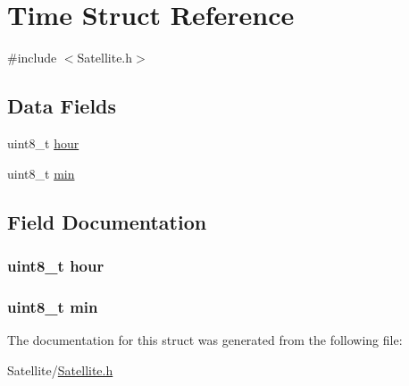 \hypertarget{struct_time}{\section{Time Struct Reference}
\label{struct_time}
}


{\ttfamily \#include $<$Satellite.\-h$>$}

\subsection*{Data Fields}
\begin{DoxyCompactItemize}
\item 
uint8\-\_\-t \hyperlink{struct_time_ae5af4ff48939d13d480f87e56a9385d6}{hour}
\item 
uint8\-\_\-t \hyperlink{struct_time_ac9b481208b43f7c37ed25e446bdec692}{min}
\end{DoxyCompactItemize}


\subsection{Field Documentation}
\hypertarget{struct_time_ae5af4ff48939d13d480f87e56a9385d6}{
\subsubsection[{hour}]{\setlength{\rightskip}{0pt plus 5cm}uint8\-\_\-t {\bf hour}}}\label{struct_time_ae5af4ff48939d13d480f87e56a9385d6}
\hypertarget{struct_time_ac9b481208b43f7c37ed25e446bdec692}{
\subsubsection[{min}]{\setlength{\rightskip}{0pt plus 5cm}uint8\-\_\-t {\bf min}}}\label{struct_time_ac9b481208b43f7c37ed25e446bdec692}


The documentation for this struct was generated from the following file\-:\begin{DoxyCompactItemize}
\item 
Satellite/\hyperlink{_satellite_8h}{Satellite.\-h}\end{DoxyCompactItemize}
